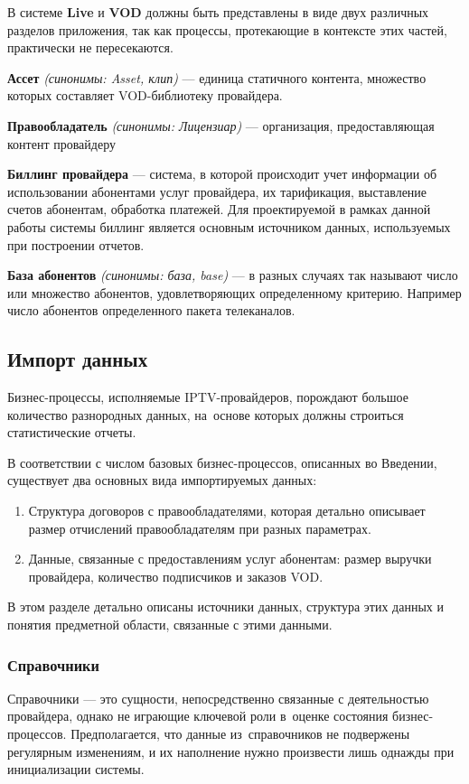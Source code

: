 В системе \textbf{Live} и \textbf{VOD} должны быть представлены в виде двух различных разделов приложения,
так как процессы, протекающие в контексте этих частей, практически не пересекаются.

\label{gloss:asset}
\textbf{Ассет} \textit{(синонимы: Asset, клип)} --- единица статичного контента, множество которых составляет
VOD-библиотеку провайдера.

\textbf{Правообладатель} \textit{(синонимы: Лицензиар)} --- организация, предоставляющая контент провайдеру

\textbf{Биллинг провайдера} --- система, в которой происходит учет информации об использовании абонентами услуг провайдера, их тарификация, 
выставление счетов абонентам, обработка платежей. Для проектируемой в рамках данной работы системы биллинг является основным источником
данных, используемых при построении отчетов.

\textbf{База абонентов} \textit{(синонимы: база, base)} --- в разных случаях так называют число или множество абонентов,
удовлетворяющих определенному критерию. Например число абонентов определенного пакета телеканалов.

\subsection{Импорт данных}
Бизнес-процессы, исполняемые IPTV-провайдеров, порождают большое количество разнородных данных, 
на~основе которых должны строиться статистические отчеты.

В соответствии с числом базовых бизнес-процессов, описанных во Введении, существует два
основных вида импортируемых данных:

\begin{enumerate}
\item{
Структура договоров с правообладателями, которая детально описывает размер 
отчислений правообладателям при разных параметрах.
}
\item{
Данные, связанные с предоставлениям услуг абонентам: размер выручки провайдера, количество подписчиков и заказов VOD. 
}
\end{enumerate}

В этом разделе детально описаны источники данных, структура этих данных и понятия предметной области,
связанные с этими данными.

\subsubsection{Справочники}
Справочники --- это сущности, непосредственно связанные с деятельностью провайдера, однако не играющие ключевой роли
в~оценке состояния бизнес-процессов. Предполагается, что данные из~справочников не подвержены регулярным изменениям,
и их наполнение нужно произвести лишь однажды при инициализации системы.

